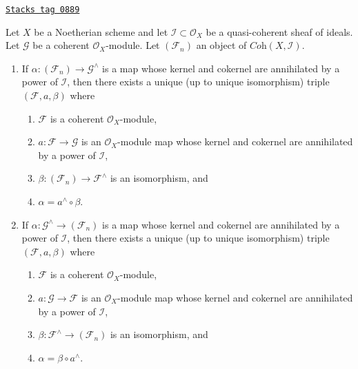 \begin{lemma}
\label{coherent-lemma-existence-easy}
\href{https://stacks.math.columbia.edu/tag/0889}{\texttt{Stacks tag 0889}}

Let $X$ be a Noetherian scheme and let $\mathcal{I} \subset \mathcal{O}_X$
be a quasi-coherent sheaf of ideals. Let $\mathcal{G}$ be a coherent
$\mathcal{O}_X$-module. Let $(\mathcal{F}_n)$ an object of
$\textit{Coh}(X, \mathcal{I})$.
\begin{enumerate}
\item If $\alpha : (\mathcal{F}_n) \to \mathcal{G}^\wedge$ is
a map whose kernel and cokernel are annihilated by a power of $\mathcal{I}$,
then there exists a unique (up to unique isomorphism) triple
$(\mathcal{F}, a, \beta)$ where
\begin{enumerate}
\item $\mathcal{F}$ is a coherent $\mathcal{O}_X$-module,
\item $a : \mathcal{F} \to \mathcal{G}$ is an $\mathcal{O}_X$-module map
whose kernel and cokernel are annihilated by a power of $\mathcal{I}$,
\item $\beta : (\mathcal{F}_n) \to \mathcal{F}^\wedge$ is an isomorphism, and
\item $\alpha = a^\wedge \circ \beta$.
\end{enumerate}
\item If $\alpha : \mathcal{G}^\wedge \to (\mathcal{F}_n)$ is
a map whose kernel and cokernel are annihilated by a power of $\mathcal{I}$,
then there exists a unique (up to unique isomorphism) triple
$(\mathcal{F}, a, \beta)$ where
\begin{enumerate}
\item $\mathcal{F}$ is a coherent $\mathcal{O}_X$-module,
\item $a : \mathcal{G} \to \mathcal{F}$ is an $\mathcal{O}_X$-module map
whose kernel and cokernel are annihilated by a power of $\mathcal{I}$,
\item $\beta : \mathcal{F}^\wedge \to (\mathcal{F}_n)$ is an isomorphism, and
\item $\alpha = \beta \circ a^\wedge$.
\end{enumerate}
\end{enumerate}
\end{lemma}

